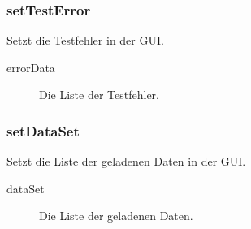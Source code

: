 \documentclass[a4paper,10pt]{scrartcl}
\begin{document}
\subsubsection{setTestError}
Setzt die Testfehler in der GUI.
\begin{description}
\item[errorData] Die Liste der Testfehler.
\end{description}

\subsubsection{setDataSet}
Setzt die Liste der geladenen Daten in der GUI.
\begin{description}
\item[dataSet] Die Liste der geladenen Daten.
\end{description}
\end{document}
